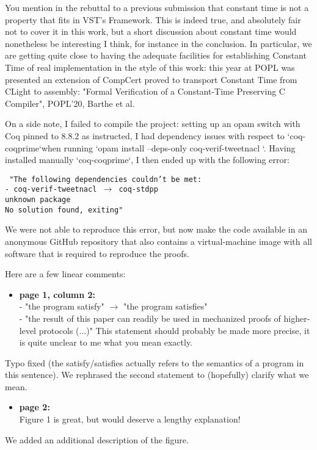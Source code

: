 You mention in the rebuttal to a previous submission that constant time is not a property that fits in VST's Framework. This is indeed true, and absolutely fair not to cover it in this work, but a short discussion about constant time would nonetheless be interesting I think, for instance in the conclusion. In particular, we are getting quite close to having the adequate facilities for establishing Constant Time of real implementation in the style of this work: this year at POPL was presented an extension of CompCert proved to transport Constant Time from CLight to assembly:
"Formal Verification of a Constant-Time Preserving C Compiler", POPL'20, Barthe et al.

On a side note, I failed to compile the project: setting up an opam switch with Coq pinned to 8.8.2 as instructed, I had dependency issues with respect to `coq-coqprime`when running `opam install --deps-only coq-verif-tweetnacl `. Having installed manually `coq-coqprime`, I then ended up with the following error:

{\footnotesize\texttt{
  "The following dependencies couldn't be met:\\
  - coq-verif-tweetnacl $\rightarrow$ coq-stdpp \\
  unknown package\\
  No solution found, exiting"}}
\begin{answer}
  We were not able to reproduce this error, but 
  now make the code available in an anonymous GitHub repository that also contains
  a virtual-machine image with all software that is required to reproduce the proofs.
\end{answer}

Here are a few linear comments:

\begin{itemize}
  \item \textbf{page 1, column 2:}\\
    - "the program satisfy" $\rightarrow$ "the program satisfies"\\
    - "the result of this paper can readily be used in mechanized proofs of higher-level protocols (...)"
    This statement should probably be made more precise, it is quite unclear to me what you mean exactly.
\end{itemize}
\begin{answer}
  Typo fixed (the satisfy/satisfies actually refers to the semantics of a program in this sentence).
  We rephrased the second statement to (hopefully) clarify what we mean.
\end{answer}
\begin{itemize}

  \item \textbf{page 2:}\\
    Figure 1 is great, but would deserve a lengthy explanation!
\end{itemize}
\begin{answer}
  We added an additional description of the figure.
\end{answer}

